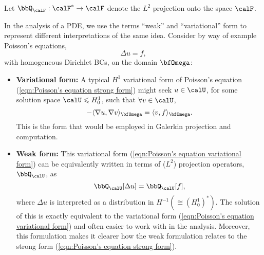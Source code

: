     \shortline

    Let $\bbQ_{\calF} : \calF^{*} \rightarrow \calF$ denote the $L^{2}$ projection onto the space $\calF$.

    In the analysis of a PDE, we use the terms ``weak'' and ``variational'' form to represent different interpretations of the same idea. Consider by way of example Poisson's equations,
    \begin{equation}\label{eqn:Poisson's equation strong form}
        \Delta u  =  f,
    \end{equation}
    with homogeneous Dirichlet BCs, on the domain $\bfOmega$:
    \begin{itemize}
        \item  {\bf Variational form:} A typical $H^{1}$ variational form of Poisson's equation (\ref{eqn:Poisson's equation strong form}) might seek $u \in \calU$, for some solution space $\calU \leqslant H^{1}_{0}$, such that $\forall v \in \calU$,
        \begin{equation}\label{eqn:Poisson's equation variational form}
            - \langle\nabla u, \nabla v\rangle_{\bfOmega}  =  \langle v, f\rangle_{\bfOmega}.
        \end{equation}
        This is the form that would be employed in Galerkin projection and computation.
        \item  {\bf Weak form:} This variational form (\ref{eqn:Poisson's equation variational form}) can be equivalently written in terms of ($L^{2}$) projection operators, $\bbQ_{\calU}$, as
        \begin{equation}
            \bbQ_{\calU}[\Delta u]  =  \bbQ_{\calU}[f],
        \end{equation}
        where $\Delta u$ is interpreted as a distribution in $H^{- 1} (\cong (H^{1}_{0})^{*})$. The solution of this is exactly equivalent to the variational form (\ref{eqn:Poisson's equation variational form}) and often easier to work with in the analysis. Moreover, this formulation makes it clearer how the weak formulation relates to the strong form (\ref{eqn:Poisson's equation strong form}).
    \end{itemize}

